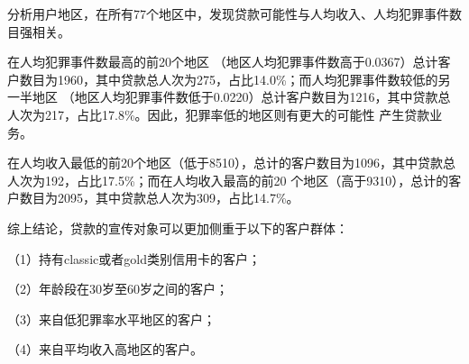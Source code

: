 \documentclass[a4paper]{article}
\begin{document}
\begin{enumerate}
  分析用户地区，在所有77个地区中，发现贷款可能性与人均收入、人均犯罪事件数目强相关。

  
  在人均犯罪事件数最高的前20个地区
  （地区人均犯罪事件数高于0.0367）总计客户数目为1960，其中贷款总人次为275，占比14.0\%；而人均犯罪事件数较低的另一半地区
  （地区人均犯罪事件数低于0.0220）总计客户数目为1216，其中贷款总人次为217，占比17.8\%。因此，犯罪率低的地区则有更大的可能性
  产生贷款业务。
  
  在人均收入最低的前20个地区（低于8510），总计的客户数目为1096，其中贷款总人次为192，占比17.5\%；而在人均收入最高的前20
  个地区（高于9310），总计的客户数目为2095，其中贷款总人次为309，占比14.7\%。

  综上结论，贷款的宣传对象可以更加侧重于以下的客户群体：

  （1）持有classic或者gold类别信用卡的客户；

  （2）年龄段在30岁至60岁之间的客户；

  （3）来自低犯罪率水平地区的客户；

  （4）来自平均收入高地区的客户。
\end{enumerate}
\end{document}
